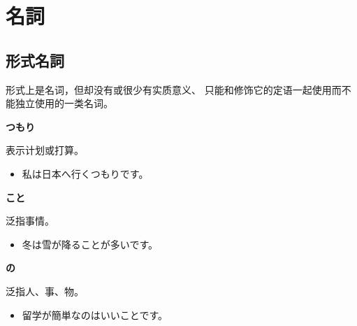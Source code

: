 \section{名詞}%

\subsection{形式名詞}%

形式上是名词，但却没有或很少有实质意义、
只能和修饰它的定语一起使用而不能独立使用的一类名词。

{\bf
\noindent つもり
}

表示计划或打算。
\begin{itemize}
  \item 私は日本へ行くつもりです。
\end{itemize}

{\bf
\noindent こと
}

泛指事情。
\begin{itemize}
  \item 冬は雪が降ることが多いです。
\end{itemize}

{\bf
\noindent の
}

泛指人、事、物。
\begin{itemize}
  \item 留学が簡単なのはいいことです。
\end{itemize}
